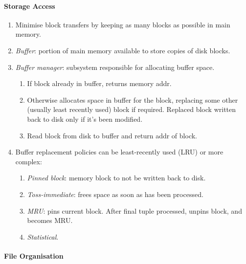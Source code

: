 \documentclass[twocolumn,english]{article}
\begin{document}
\paragraph{Storage Access}
\begin{enumerate}
\item Minimise block transfers by keeping as many blocks as possible in
main memory.
\item \emph{Buffer}: portion of main memory available to store copies of
disk blocks.
\item \emph{Buffer manager}: subsystem responsible for allocating buffer
space.

\begin{enumerate}
\item If block already in buffer, returns memory addr.
\item Otherwise allocates space in buffer for the block, replacing some
other (usually least recently used) block if required. Replaced block
written back to disk only if it's been modified.
\item Read block from disk to buffer and return addr of block.
\end{enumerate}
\item Buffer replacement policies can be least-recently used (LRU) or more
complex:

\begin{enumerate}
\item \emph{Pinned block}: memory block to not be written back to disk.
\item \emph{Toss-immediate}: frees space as soon as has been processed.
\item \emph{MRU}: pins current block. After final tuple processed, unpins
block, and becomes MRU.
\item \emph{Statistical}.
\end{enumerate}
\end{enumerate}

\paragraph{File Organisation}
\end{document}
